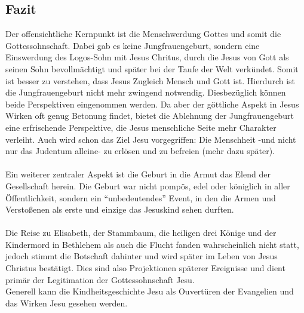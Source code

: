\subsection{Fazit}
Der offensichtliche Kernpunkt ist die Menschwerdung Gottes und somit die Gottessohnschaft. Dabei gab es keine Jungfrauengeburt, sondern eine Einswerdung des Logos-Sohn mit Jesus Chritus, durch die Jesus von Gott als seinen Sohn bevollmächtigt und später bei der Taufe der Welt verkündet. Somit ist besser zu verstehen, dass Jesus Zugleich Mensch und Gott ist. Hierdurch ist die Jungfrauengeburt nicht mehr zwingend notwendig. Diesbezüglich können beide Perspektiven eingenommen werden. Da aber der göttliche Aspekt in Jesus Wirken oft genug Betonung findet, bietet die Ablehnung der Jungfrauengeburt eine erfrischende Perspektive, die Jesus menschliche Seite mehr Charakter verleiht. Auch wird schon das Ziel Jesu vorgegriffen: Die Menschheit -und nicht nur das Judentum alleine- zu erlösen und zu befreien (mehr dazu später).
\\~\\
Ein weiterer zentraler Aspekt ist die Geburt in die Armut das Elend der Gesellschaft herein. Die Geburt war nicht pompös, edel oder königlich in aller Öffentlichkeit, sondern ein ``unbedeutendes'' Event, in den die Armen und Verstoßenen als erste und einzige das Jesuskind sehen durften.
\\~\\
Die Reise zu Elisabeth, der Stammbaum, die heiligen drei Könige und der Kindermord in Bethlehem als auch die Flucht fanden wahrscheinlich nicht statt, jedoch stimmt die Botschaft dahinter und wird später im Leben von Jesus Christus bestätigt. Dies sind also Projektionen späterer Ereignisse und dient primär der Legitimation der Gottessohnschaft Jesu. 
\\ 
Generell kann die Kindheitsgeschichte Jesu als Ouvertüren der Evangelien und das Wirken Jesu gesehen werden.

